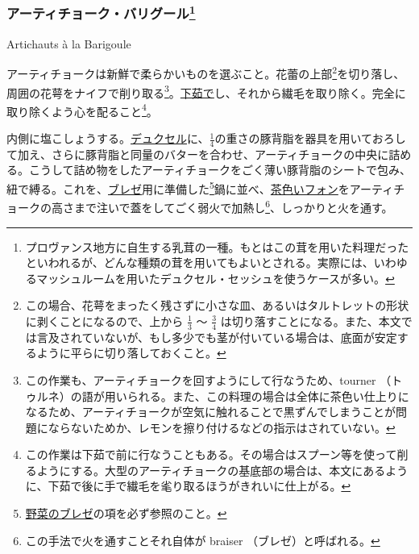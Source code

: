 \begin{recette}

\hypertarget{artichauts-a-la-barigoule}{%
\subsubsection[アーティチョーク・バリグール]{\texorpdfstring{アーティチョーク・バリグール\footnote{プロヴァンス地方に自生する乳茸の一種。もとはこの茸を用いた料理だったといわれるが、どんな種類の茸を用いてもよいとされる。実際には、いわゆるマッシュルームを用いたデュクセル・セッシュを使うケースが多い。}}{アーティチョーク・バリグール}}\label{artichauts-a-la-barigoule}}

\begin{frsubenv}

Artichauts à la Barigoule

\end{frsubenv}


アーティチョークは新鮮で柔らかいものを選ぶこと。花蕾の上部\footnote{この場合、花萼をまったく残さずに小さな皿、あるいはタルトレットの形状に剥くことになるので、上から
  \(\frac{1}{3}\) 〜 \(\frac{3}{4}\)
  は切り落すことになる。また、本文では言及されていないが、もし多少でも茎が付いている場合は、底面が安定するように平らに切り落しておくこと。}を切り落し、周囲の花萼をナイフで削り取る\footnote{この作業も、アーティチョークを回すようにして行なうため、tourner
  （トゥルネ）の語が用いられる。また、この料理の場合は全体に茶色い仕上りになるため、アーティチョークが空気に触れることで黒ずんでしまうことが問題にならないためか、レモンを擦り付けるなどの指示はされていない。}。\protect\hyperlink{blanchissage}{下茹で}し、それから繊毛を取り除く。完全に取り除くよう心を配ること\footnote{この作業は下茹で前に行なうこともある。その場合はスプーン等を使って削るようにする。大型のアーティチョークの基底部の場合は、本文にあるように、下茹で後に手で繊毛を毟り取るほうがきれいに仕上がる。}。

内側に塩こしょうする。\protect\hyperlink{duxelles-seche}{デュクセル}に、\(\frac{1}{4}\)の重さの豚背脂を器具を用いておろして加え、さらに豚背脂と同量のバターを合わせ、アーティチョークの中央に詰める。こうして詰め物をしたアーティチョークをごく薄い豚背脂のシートで包み、紐で縛る。これを、\protect\hyperlink{braisage-des-legumes}{ブレゼ}用に準備した\footnote{\protect\hyperlink{braisage-des-legumes}{野菜のブレゼ}の項を必ず参照のこと。}鍋に並べ、\protect\hyperlink{fonds-brun}{茶色いフォン}をアーティチョークの高さまで注いで蓋をしてごく弱火で加熱し\footnote{この手法で火を通すことそれ自体が
  braiser （ブレゼ）と呼ばれる。}、しっかりと火を通す。


\end{recette}
